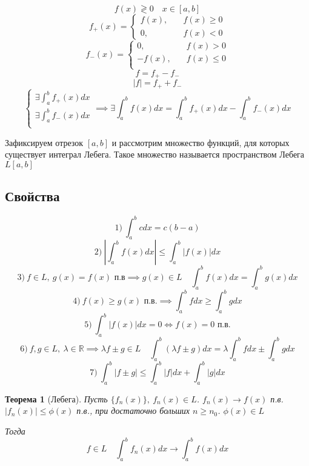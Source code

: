 \documentclass[a4paper]{article}
\newtheorem*{theorem}{Теорема}
\theoremstyle{definition}
\theoremstyle{remark}
\begin{document}
\[
    f(x) \gtrless 0 \quad x \in [a,b]
\]
\[
    f_+(x) = \begin{cases}
        f(x), &\quad f(x) \geq 0\\
        0, &\quad f(x) < 0
    \end{cases}
\]
\[
    f_-(x) = \begin{cases}
        0, &\quad f(x) > 0\\
        -f(x), &\quad f(x) \leq 0\\
    \end{cases}
\]
\[
    f = f_+ - f_-
\]
\[
    |f| = f_+ + f_-
\]
\[
    \begin{cases}
        \exists \int_{a}^{b} f_+(x) dx\\
        \exists \int_{a}^{b} f_-(x) dx\\
    \end{cases} \implies
    \exists \int_{a}^{b} f(x) dx = \int_{a}^{b} f_+(x) dx - \int_{a}^{b} f_-(x) dx
\]

Зафиксируем отрезок $ [a,b] $ и рассмотрим множество функций, для которых
существует интеграл Лебега. Такое множество называется пространством Лебега
$ L[a,b] $ 
\subsection*{Свойства}
\[
    1) \ \int_{a}^{b} c dx = c(b-a)
\]
\[
    2) \ \left| \int_{a}^{b} f(x) dx \right| \leq \int_{a}^{b} |f(x)| dx
\]
\[
    3) \ f \in L, \ g(x) = f(x) \text{ п.в} \implies g(x) \in L \quad 
    \int_{a}^{b} f(x) dx = \int_{a}^{b} g(x) dx
\]
\[
    4) \ f(x) \geq g(x) \text{ п.в.} \implies \int_{a}^{b} f dx \geq \int_{a}^{b} 
    g dx
\]
\[
    5) \ \int_{a}^{b} |f(x)| dx = 0 \iff f(x) = 0 \text{ п.в.}
\]
\[
    6) \ f,g \in L, \ \lambda \in \mathbb{R} \implies \lambda f \pm g \in L
    \quad \int_{a}^{b} (\lambda f \pm g) dx = \lambda \int_{a}^{b} fdx \pm 
    \int_{a}^{b} gdx
\]
\[
    7) \ \int_{a}^{b} |f \pm g| \leq \int_{a}^{b} |f|dx + \int_{a}^{b} |g|dx
\]

\begin{tcolorbox}[title=Теорема Лебега]
    \begin{theorem}[Лебега]
        Пусть $ \{ f_n(x) \}, \ f_n(x) \in L $. $ f_n(x) \to f(x) $ п.в.\\
        $ |f_n(x)| \leq \phi(x) $ п.в., при достаточно больших $ n \geq n_0 $.
        $ \phi(x) \in L $ 

        Тогда
        \begin{displaymath}
            f \in L \quad \int_{a}^{b} f_n(x) dx \to \int_{a}^{b} f(x) dx
        \end{displaymath}

    \end{theorem}
\end{tcolorbox}
\end{document}
